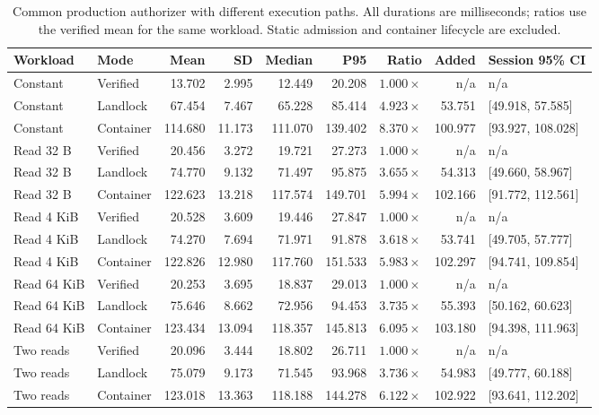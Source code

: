 \begin{table}[t]
\centering
\small
\setlength{\tabcolsep}{3pt}
\begin{tabular*}{\textwidth}{@{\extracolsep{\fill}}llrrrrrrl@{}}
\toprule
Workload & Mode & Mean & SD & Median & P95 & Ratio & Added & Session 95\% CI \\
\midrule
Constant & Verified & 13.702 & 2.995 & 12.449 & 20.208 & $1.000\times$ & n/a & n/a \\
Constant & Landlock & 67.454 & 7.467 & 65.228 & 85.414 & $4.923\times$ & 53.751 & [49.918, 57.585] \\
Constant & Container & 114.680 & 11.173 & 111.070 & 139.402 & $8.370\times$ & 100.977 & [93.927, 108.028] \\
\addlinespace
Read 32 B & Verified & 20.456 & 3.272 & 19.721 & 27.273 & $1.000\times$ & n/a & n/a \\
Read 32 B & Landlock & 74.770 & 9.132 & 71.497 & 95.875 & $3.655\times$ & 54.313 & [49.660, 58.967] \\
Read 32 B & Container & 122.623 & 13.218 & 117.574 & 149.701 & $5.994\times$ & 102.166 & [91.772, 112.561] \\
\addlinespace
Read 4 KiB & Verified & 20.528 & 3.609 & 19.446 & 27.847 & $1.000\times$ & n/a & n/a \\
Read 4 KiB & Landlock & 74.270 & 7.694 & 71.971 & 91.878 & $3.618\times$ & 53.741 & [49.705, 57.777] \\
Read 4 KiB & Container & 122.826 & 12.980 & 117.760 & 151.533 & $5.983\times$ & 102.297 & [94.741, 109.854] \\
\addlinespace
Read 64 KiB & Verified & 20.253 & 3.695 & 18.837 & 29.013 & $1.000\times$ & n/a & n/a \\
Read 64 KiB & Landlock & 75.646 & 8.662 & 72.956 & 94.453 & $3.735\times$ & 55.393 & [50.162, 60.623] \\
Read 64 KiB & Container & 123.434 & 13.094 & 118.357 & 145.813 & $6.095\times$ & 103.180 & [94.398, 111.963] \\
\addlinespace
Two reads & Verified & 20.096 & 3.444 & 18.802 & 26.711 & $1.000\times$ & n/a & n/a \\
Two reads & Landlock & 75.079 & 9.173 & 71.545 & 93.968 & $3.736\times$ & 54.983 & [49.777, 60.188] \\
Two reads & Container & 123.018 & 13.363 & 118.188 & 144.278 & $6.122\times$ & 102.922 & [93.641, 112.202] \\
\bottomrule
\end{tabular*}
\caption{Common production authorizer with different execution paths. All durations are milliseconds; ratios use the verified mean for the same workload. Static admission and container lifecycle are excluded.}
\label{tab:common-authorizer}
\end{table}

